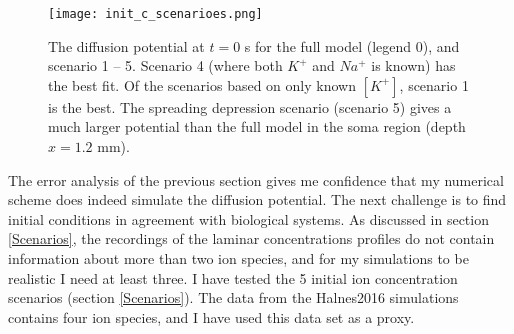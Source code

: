 \documentclass{article}
\begin{document}
\begin{figure}
  \texttt{[image: init\_c\_scenarioes.png]}
  \caption{The diffusion potential at $t=0$ s for the full model (legend 0), and scenario 1 -- 5. Scenario 4 (where both $K^+$ and $Na^+$ is known) has the best fit. Of the scenarios based on only known $[K^+]$, scenario 1 is the best. The spreading depression scenario (scenario 5) gives a much larger potential than the full model in the soma region (depth $x=1.2$ mm). }
  \label{fig:init_c_scenarioes}
\end{figure}
The error analysis of the previous section gives me confidence that my numerical scheme does indeed simulate the diffusion potential. The next challenge is to find initial conditions in agreement with biological systems. As discussed in section \ref{Scenarios}, the recordings of the laminar concentrations profiles do not contain information about more than two ion species, and for my simulations to be realistic I need at least three. I have tested the 5 initial ion concentration scenarios (section \ref{Scenarios}). The data from the Halnes2016 simulations contains four ion species, and I have used this data set as a proxy.
\end{document}
